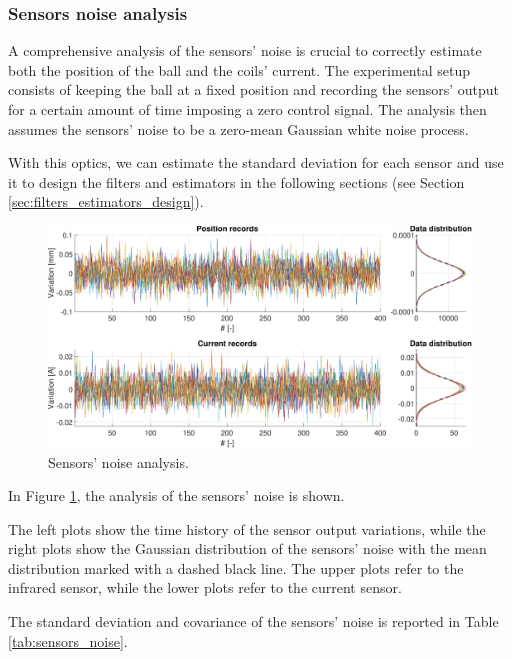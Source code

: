 \subsubsection{Sensors noise analysis}
\label{subsubsec:sensors_noise}

A comprehensive analysis of the sensors' noise is crucial to correctly estimate both the position of the ball and the coils' current.
The experimental setup consists of keeping the ball at a fixed position and recording the sensors' output for a certain amount of time imposing a zero control signal.
The analysis then assumes the sensors' noise to be a zero-mean Gaussian white noise process.

With this optics, we can estimate the standard deviation for each sensor and use it to design the filters and estimators in the following sections (see Section \ref{sec:filters_estimators_design}).

\begin{figure}[H]
    \centering
    \includegraphics[width=1\textwidth]{img/MATLAB/identification/sensor_noises.pdf}
    \caption{Sensors' noise analysis.}
    \label{fig:sensors_noise}
\end{figure}

In Figure \ref{fig:sensors_noise}, the analysis of the sensors' noise is shown.

The left plots show the time history of the sensor output variations, while the right plots show the Gaussian distribution of the sensors' noise with the mean distribution marked with a dashed black line.
The upper plots refer to the infrared sensor, while the lower plots refer to the current sensor.

The standard deviation and covariance of the sensors' noise is reported in Table \ref{tab:sensors_noise}.

